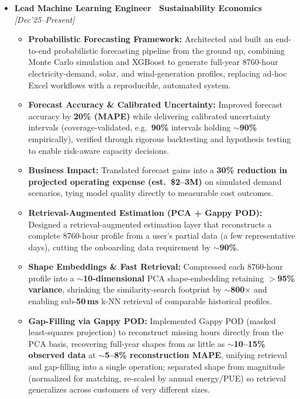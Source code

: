 \documentclass[10pt,article]{article}
\begin{document}
\begin{itemize}
   \item \textbf{Lead Machine Learning Engineer \textbar\ Sustainability Economics} \hfill \textit{[Dec'25--Present]}
   \begin{itemize}
       \item \textbf{Probabilistic Forecasting Framework:} Architected and built an end-to-end probabilistic forecasting pipeline from the ground up, combining Monte Carlo simulation and XGBoost to generate full-year 8760-hour electricity-demand, solar, and wind-generation profiles, replacing ad-hoc Excel workflows with a reproducible, automated system.
       \item \textbf{Forecast Accuracy \& Calibrated Uncertainty:} Improved forecast accuracy by \textbf{20\% (MAPE)} while delivering calibrated uncertainty intervals (coverage-validated, e.g.\ \textbf{90\%} intervals holding \textbf{$\sim$90\%} empirically), verified through rigorous backtesting and hypothesis testing to enable risk-aware capacity decisions.
       \item \textbf{Business Impact:} Translated forecast gains into a \textbf{30\% reduction in projected operating expense (est.\ \$2--3M)} on simulated demand scenarios, tying model quality directly to measurable cost outcomes.
       \item \textbf{Retrieval-Augmented Estimation (PCA + Gappy POD):} Designed a retrieval-augmented estimation layer that reconstructs a complete 8760-hour profile from a user's partial data (a few representative days), cutting the onboarding data requirement by \textbf{$\sim$90\%}.
       \item \textbf{Shape Embeddings \& Fast Retrieval:} Compressed each 8760-hour profile into a \textbf{$\sim$10-dimensional} PCA shape-embedding retaining \textbf{$>$95\% variance}, shrinking the similarity-search footprint by \textbf{$\sim$800$\times$} and enabling sub-\textbf{50\,ms} k-NN retrieval of comparable historical profiles.
       \item \textbf{Gap-Filling via Gappy POD:} Implemented Gappy POD (masked least-squares projection) to reconstruct missing hours directly from the PCA basis, recovering full-year shapes from as little as \textbf{$\sim$10--15\% observed data} at \textbf{$\sim$5--8\% reconstruction MAPE}, unifying retrieval and gap-filling into a single operation; separated shape from magnitude (normalized for matching, re-scaled by annual energy/PUE) so retrieval generalizes across customers of very different sizes.

\end{itemize}
\end{itemize}
\end{document}
